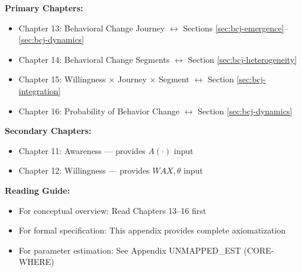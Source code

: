 \label{app:bcj}

\begin{tcolorbox}[colback=purple!5!white, colframe=purple!75!black,
    title=Chapter Linkage]

\textbf{Primary Chapters:}
\begin{itemize}[nosep]
\item Chapter 13: Behavioral Change Journey $\leftrightarrow$ Sections \ref{sec:bcj-emergence}--\ref{sec:bcj-dynamics}
\item Chapter 14: Behavioral Change Segments $\leftrightarrow$ Section \ref{sec:bcj-heterogeneity}
\item Chapter 15: Willingness × Journey × Segment $\leftrightarrow$ Section \ref{sec:bcj-integration}
\item Chapter 16: Probability of Behavior Change $\leftrightarrow$ Section \ref{sec:bcj-dynamics}
\end{itemize}

\textbf{Secondary Chapters:}
\begin{itemize}[nosep]
\item Chapter 11: Awareness --- provides $A(\cdot)$ input
\item Chapter 12: Willingness --- provides $WAX, \theta$ input
\end{itemize}

\textbf{Reading Guide:}
\begin{itemize}[nosep]
\item For conceptual overview: Read Chapters 13--16 first
\item For formal specification: This appendix provides complete axiomatization
\item For parameter estimation: See Appendix UNMAPPED_EST (CORE-WHERE)
\end{itemize}

\end{tcolorbox}

